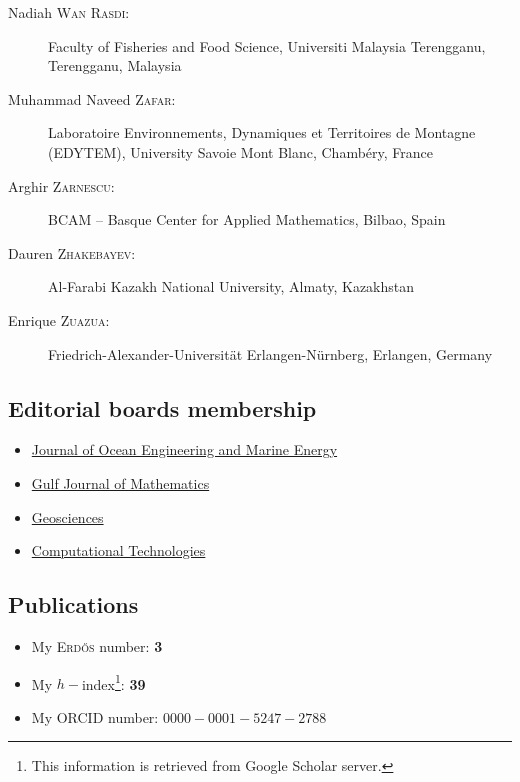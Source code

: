 \documentclass[final, a4paper, oneside, 12pt]{article}
\numberwithin{equation}{section}
\begin{document}
\begin{description}
  \item[Nadiah \textsc{Wan Rasdi}:] Faculty of Fisheries and Food Science, Universiti Malaysia Terengganu, Terengganu, Malaysia
  \item[Muhammad Naveed \textsc{Zafar}:] Laboratoire Environnements, Dynamiques et Territoires de Montagne (EDYTEM), University Savoie Mont Blanc, Chamb\'ery, France 
  \item[Arghir \textsc{Zarnescu}:] BCAM -- Basque Center for Applied Mathematics, Bilbao, Spain
  \item[Dauren \textsc{Zhakebayev}:] Al-Farabi Kazakh National University, Almaty, Kazakhstan
  \item[Enrique \textsc{Zuazua}:] Friedrich-Alexander-Universität Erlangen-Nürnberg, Erlangen, Germany

\end{description}

\subsection{Editorial boards membership}

\begin{itemize}

  \item \href{https://www.springer.com/engineering/civil+engineering/journal/40722}{Journal of Ocean Engineering and Marine Energy}
  \item \href{https://gjom.org/index.php/gjom}{Gulf Journal of Mathematics}
  \item \href{https://www.mdpi.com/journal/geosciences/}{Geosciences}
  \item \href{http://www.ict.nsc.ru/jct/}{Computational Technologies}
  
\end{itemize}

\subsection{Publications}

\begin{itemize}
  \item My \textsc{Erd\H{o}s} number: \textbf{3}
  \item My $h-$index\footnote{This information is retrieved from Google Scholar server.}: \textbf{39}
  \item My ORCID number: $0000-0001-5247-2788$
\end{itemize}
\end{document}
